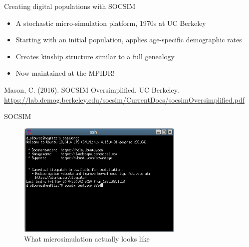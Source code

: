 \documentclass[
  ignorenonframetext,
]{beamer}
\providecommand{\tightlist}{%
  \setlength{\itemsep}{0pt}\setlength{\parskip}{0pt}}
\begin{document}
\begin{frame}{Creating digital populations with SOCSIM}
\protect\hypertarget{creating-digital-populations-with-socsim}{}

\begin{itemize}
\tightlist
\item
  A stochastic micro-simulation platform, 1970s at UC Berkeley
\item
  Starting with an initial population, applies age-specific demographic
  rates
\item
  Creates kinship structure similar to a full genealogy
\item
  Now maintained at the MPIDR!
\end{itemize}

\tiny Mason, C. (2016). SOCSIM Oversimplified. UC Berkeley.
\url{https://lab.demog.berkeley.edu/socsim/CurrentDocs/socsimOversimplified.pdf}

\end{frame}

\begin{frame}{SOCSIM}
\protect\hypertarget{socsim}{}

\begin{figure}
\centering
\includegraphics[width=3.125in,height=\textheight]{resources/socsim.PNG}
\caption{What microsimulation actually looks like}
\end{figure}

\end{frame}
\end{document}
